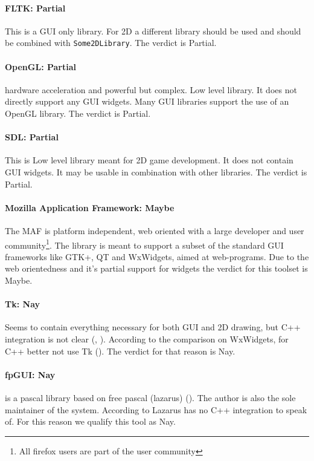 \paragraph{FLTK: Partial} This is a GUI only library. For 2D a different library
should be used and should be combined with \verb!Some2DLibrary!. The verdict is
Partial.

\paragraph{OpenGL: Partial} hardware acceleration and powerful but complex. Low
level library. It does not directly support any GUI widgets. Many GUI libraries
support the use of an OpenGL library. The verdict is Partial.

\paragraph{SDL: Partial} This is Low level library meant for 2D game
development. It does not contain GUI widgets. It may be usable in combination
with other libraries. The verdict is Partial.

\paragraph{Mozilla Application Framework: Maybe} The MAF is platform
independent, web oriented with a large developer and user
community\footnote{All firefox users are part of the user community}.  The
library is meant to support a subset of the standard GUI frameworks like GTK+,
QT and WxWidgets, aimed at web-programs. Due to the web orientedness and it's
partial support for widgets the verdict for this toolset is Maybe.

\paragraph{Tk: Nay} Seems to contain everything necessary for both GUI and 2D
drawing, but C++ integration is not clear (\cite{wiki:tk}, \cite{tcltk:tk}).
According to the comparison on WxWidgets, for C++ better not use Tk
(\cite{wxwidget:comparison}).  The verdict for that reason is Nay.

\paragraph{fpGUI: Nay} is a pascal library based on free pascal (lazarus)
(\cite{Geldenhuys:fpgui}).  The author is also the sole maintainer of the
system. According to \cite{wxwidget:comparison} Lazarus has no C++ integration
to speak of. For this reason we qualify this tool as Nay.

